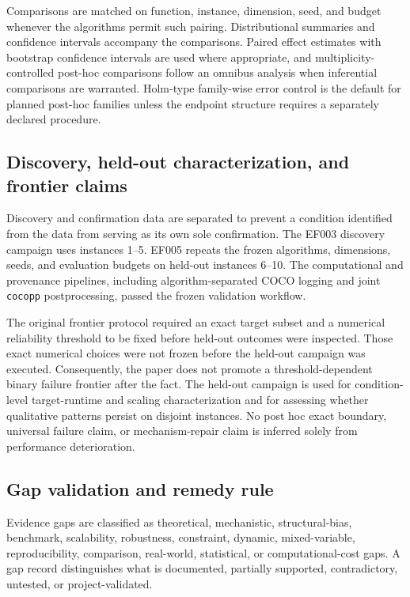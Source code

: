 Comparisons are matched on function, instance, dimension, seed, and budget whenever the algorithms permit such pairing. Distributional summaries and confidence intervals accompany the comparisons. Paired effect estimates with bootstrap confidence intervals are used where appropriate, and multiplicity-controlled post-hoc comparisons follow an omnibus analysis when inferential comparisons are warranted. Holm-type family-wise error control is the default for planned post-hoc families unless the endpoint structure requires a separately declared procedure.

\subsection{Discovery, held-out characterization, and frontier claims}

Discovery and confirmation data are separated to prevent a condition identified from the data from serving as its own sole confirmation. The EF003 discovery campaign uses instances 1--5. EF005 repeats the frozen algorithms, dimensions, seeds, and evaluation budgets on held-out instances 6--10. The computational and provenance pipelines, including algorithm-separated COCO logging and joint \texttt{cocopp} postprocessing, passed the frozen validation workflow.

The original frontier protocol required an exact target subset and a numerical reliability threshold to be fixed before held-out outcomes were inspected. Those exact numerical choices were not frozen before the held-out campaign was executed. Consequently, the paper does not promote a threshold-dependent binary failure frontier after the fact. The held-out campaign is used for condition-level target-runtime and scaling characterization and for assessing whether qualitative patterns persist on disjoint instances. No post hoc exact boundary, universal failure claim, or mechanism-repair claim is inferred solely from performance deterioration.

\subsection{Gap validation and remedy rule}

Evidence gaps are classified as theoretical, mechanistic, structural-bias, benchmark, scalability, robustness, constraint, dynamic, mixed-variable, reproducibility, comparison, real-world, statistical, or computational-cost gaps. A gap record distinguishes what is documented, partially supported, contradictory, untested, or project-validated.

